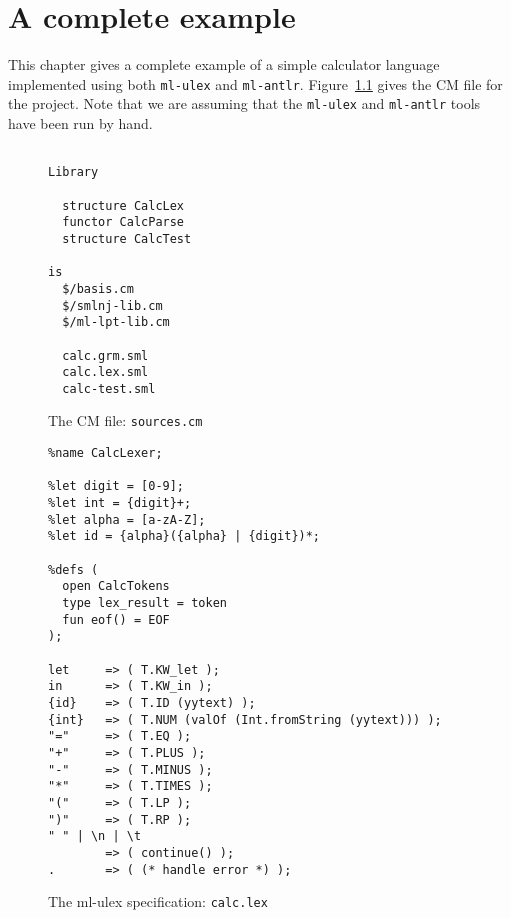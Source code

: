 %
\chapter{A complete example}
\label{ch:example}

This chapter gives a complete example of a simple calculator
language implemented using both \texttt{ml-ulex} and \texttt{ml-antlr}.
Figure~\ref{fig:calc-sources} gives the CM file for the project.
Note that we are assuming that the \texttt{ml-ulex} and \texttt{ml-antlr}
tools have been run by hand.
\begin{figure}[h]
\begin{verbatim}

Library

  structure CalcLex
  functor CalcParse
  structure CalcTest

is
  $/basis.cm
  $/smlnj-lib.cm
  $/ml-lpt-lib.cm

  calc.grm.sml
  calc.lex.sml
  calc-test.sml

\end{verbatim}
\caption{The CM file: {\tt sources.cm}}
\label{fig:calc-sources}
\end{figure}

\begin{figure}

\begin{verbatim}
%name CalcLexer;

%let digit = [0-9];
%let int = {digit}+;
%let alpha = [a-zA-Z];
%let id = {alpha}({alpha} | {digit})*;

%defs (
  open CalcTokens
  type lex_result = token
  fun eof() = EOF
);

let     => ( T.KW_let );
in      => ( T.KW_in );
{id}    => ( T.ID (yytext) );
{int}   => ( T.NUM (valOf (Int.fromString (yytext))) );
"="     => ( T.EQ );
"+"     => ( T.PLUS );
"-"     => ( T.MINUS );
"*"     => ( T.TIMES );
"("     => ( T.LP );
")"     => ( T.RP );
" " | \n | \t
        => ( continue() );
.       => ( (* handle error *) );
\end{verbatim}
\caption{The ml-ulex specification: {\tt calc.lex}}
\label{fig:calc-lex}
\end{figure}

